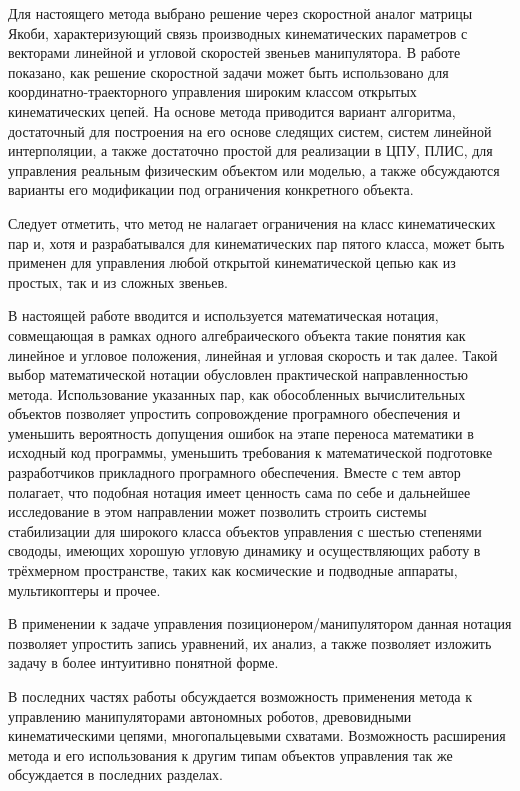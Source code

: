 Для настоящего метода выбрано решение через скоростной аналог матрицы Якоби, характеризующий связь производных кинематических параметров с векторами линейной и угловой скоростей звеньев манипулятора. В работе показано, как решение скоростной задачи может быть использовано для координатно-траекторного управления широким классом открытых кинематических цепей. На основе метода приводится вариант алгоритма, достаточный для построения на его основе следящих систем, систем линейной интерполяции, а также достаточно простой для реализации в ЦПУ, ПЛИС, для управления реальным физическим объектом или моделью, а также обсуждаются варианты его модификации под ограничения конкретного объекта.

Следует отметить, что метод не налагает ограничения на класс кинематических пар и, хотя и разрабатывался для кинематических пар пятого класса, может быть применен для управления любой открытой кинематической цепью как из простых, так и из сложных звеньев.

В настоящей работе вводится и используется математическая нотация, совмещающая в рамках одного алгебраического объекта такие понятия как линейное и угловое положения, линейная и угловая скорость и так далее. Такой выбор математической нотации обусловлен практической направленностью метода. Использование указанных пар, как обособленных вычислительных объектов позволяет упростить сопровождение програмного обеспечения и уменьшить вероятность допущения ошибок на этапе переноса математики в исходный код программы, уменьшить требования к математической подготовке разработчиков прикладного програмного обеспечения. Вместе с тем автор полагает, что подобная нотация имеет ценность сама по себе и дальнейшее исследование в этом направлении может позволить строить системы стабилизации для широкого класса объектов управления с шестью степенями свододы, имеющих хорошую угловую динамику и осуществляющих работу в трёхмерном пространстве, таких как космические и подводные аппараты, мультикоптеры и прочее.

В применении к задаче управления позиционером/манипулятором данная нотация позволяет упростить запись уравнений, их анализ, а также позволяет изложить задачу в более интуитивно понятной форме.

В последних частях работы обсуждается возможность применения метода к управлению манипуляторами автономных роботов, древовидными кинематическими цепями, многопальцевыми схватами. Возможность расширения метода и его использования к другим типам объектов управления так же обсуждается в последних разделах.